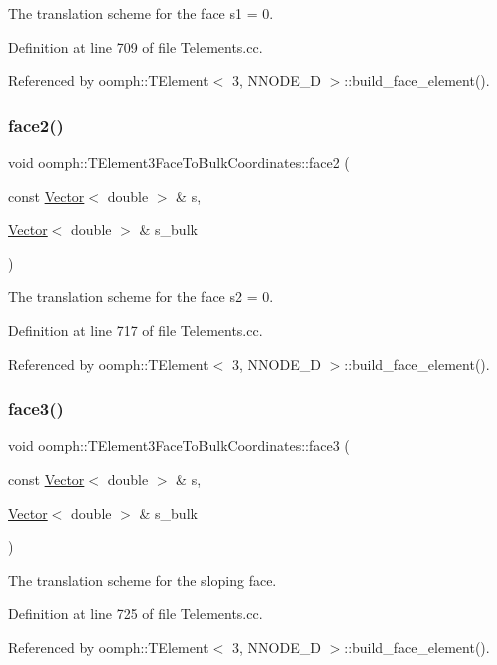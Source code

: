 The translation scheme for the face s1 = 0. 



Definition at line 709 of file Telements.\+cc.



Referenced by oomph\+::\+T\+Element$<$ 3, N\+N\+O\+D\+E\+\_\+D $>$\+::build\+\_\+face\+\_\+element().

\mbox{\label{namespaceoomph_1_1TElement3FaceToBulkCoordinates_a453bcd1929cf8dca1e2601f464eda6d1}} 
\subsubsection{\texorpdfstring{face2()}{face2()}}
{\footnotesize\ttfamily void oomph\+::\+T\+Element3\+Face\+To\+Bulk\+Coordinates\+::face2 (\begin{DoxyParamCaption}\item[{const \hyperlink{classoomph_1_1Vector}{Vector}$<$ double $>$ \&}]{s,  }\item[{\hyperlink{classoomph_1_1Vector}{Vector}$<$ double $>$ \&}]{s\+\_\+bulk }\end{DoxyParamCaption})}



The translation scheme for the face s2 = 0. 



Definition at line 717 of file Telements.\+cc.



Referenced by oomph\+::\+T\+Element$<$ 3, N\+N\+O\+D\+E\+\_\+D $>$\+::build\+\_\+face\+\_\+element().

\mbox{\label{namespaceoomph_1_1TElement3FaceToBulkCoordinates_a8f67df003a4c5d93579223d95802eb57}} 
\subsubsection{\texorpdfstring{face3()}{face3()}}
{\footnotesize\ttfamily void oomph\+::\+T\+Element3\+Face\+To\+Bulk\+Coordinates\+::face3 (\begin{DoxyParamCaption}\item[{const \hyperlink{classoomph_1_1Vector}{Vector}$<$ double $>$ \&}]{s,  }\item[{\hyperlink{classoomph_1_1Vector}{Vector}$<$ double $>$ \&}]{s\+\_\+bulk }\end{DoxyParamCaption})}



The translation scheme for the sloping face. 



Definition at line 725 of file Telements.\+cc.



Referenced by oomph\+::\+T\+Element$<$ 3, N\+N\+O\+D\+E\+\_\+D $>$\+::build\+\_\+face\+\_\+element().

